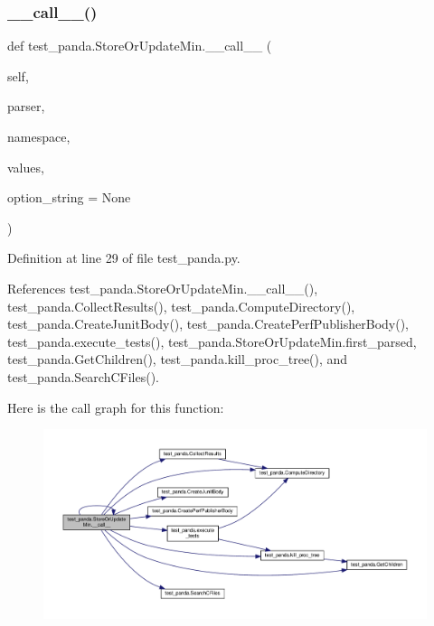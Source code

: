 \subsubsection{\texorpdfstring{\+\_\+\+\_\+call\+\_\+\+\_\+()}{\_\_call\_\_()}\hspace{0.1cm}{\footnotesize\ttfamily [2/3]}}
{\footnotesize\ttfamily def test\+\_\+panda.\+Store\+Or\+Update\+Min.\+\_\+\+\_\+call\+\_\+\+\_\+ (\begin{DoxyParamCaption}\item[{}]{self,  }\item[{}]{parser,  }\item[{}]{namespace,  }\item[{}]{values,  }\item[{}]{option\+\_\+string = {\ttfamily None} }\end{DoxyParamCaption})}



Definition at line 29 of file test\+\_\+panda.\+py.



References test\+\_\+panda.\+Store\+Or\+Update\+Min.\+\_\+\+\_\+call\+\_\+\+\_\+(), test\+\_\+panda.\+Collect\+Results(), test\+\_\+panda.\+Compute\+Directory(), test\+\_\+panda.\+Create\+Junit\+Body(), test\+\_\+panda.\+Create\+Perf\+Publisher\+Body(), test\+\_\+panda.\+execute\+\_\+tests(), test\+\_\+panda.\+Store\+Or\+Update\+Min.\+first\+\_\+parsed, test\+\_\+panda.\+Get\+Children(), test\+\_\+panda.\+kill\+\_\+proc\+\_\+tree(), and test\+\_\+panda.\+Search\+C\+Files().

Here is the call graph for this function\+:
\nopagebreak
\begin{figure}[H]
\begin{center}
\leavevmode
\includegraphics[width=350pt]{db/dd8/classtest__panda_1_1StoreOrUpdateMin_af8b0342a587abe4ea380c333ebe3dc73_cgraph}
\end{center}
\end{figure}
\mbox{\label{classtest__panda_1_1StoreOrUpdateMin_af8b0342a587abe4ea380c333ebe3dc73}} 
